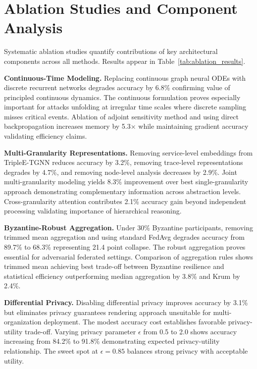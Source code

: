 \section{Ablation Studies and Component Analysis}
\label{sec:impl_ablation}

Systematic ablation studies quantify contributions of key architectural components across all methods. Results appear in Table~\ref{tab:ablation_results}.

\textbf{Continuous-Time Modeling.} Replacing continuous graph neural ODEs with discrete recurrent networks degrades accuracy by 6.8\% confirming value of principled continuous dynamics. The continuous formulation proves especially important for attacks unfolding at irregular time scales where discrete sampling misses critical events. Ablation of adjoint sensitivity method and using direct backpropagation increases memory by 5.3× while maintaining gradient accuracy validating efficiency claims.

\textbf{Multi-Granularity Representations.} Removing service-level embeddings from TripleE-TGNN reduces accuracy by 3.2\%, removing trace-level representations degrades by 4.7\%, and removing node-level analysis decreases by 2.9\%. Joint multi-granularity modeling yields 8.3\% improvement over best single-granularity approach demonstrating complementary information across abstraction levels. Cross-granularity attention contributes 2.1\% accuracy gain beyond independent processing validating importance of hierarchical reasoning.

\textbf{Byzantine-Robust Aggregation.} Under 30\% Byzantine participants, removing trimmed mean aggregation and using standard FedAvg degrades accuracy from 89.7\% to 68.3\% representing 21.4 point collapse. The robust aggregation proves essential for adversarial federated settings. Comparison of aggregation rules shows trimmed mean achieving best trade-off between Byzantine resilience and statistical efficiency outperforming median aggregation by 3.8\% and Krum by 2.4\%.

\textbf{Differential Privacy.} Disabling differential privacy improves accuracy by 3.1\% but eliminates privacy guarantees rendering approach unsuitable for multi-organization deployment. The modest accuracy cost establishes favorable privacy-utility trade-off. Varying privacy parameter $\epsilon$ from 0.5 to 2.0 shows accuracy increasing from 84.2\% to 91.8\% demonstrating expected privacy-utility relationship. The sweet spot at $\epsilon = 0.85$ balances strong privacy with acceptable utility.


